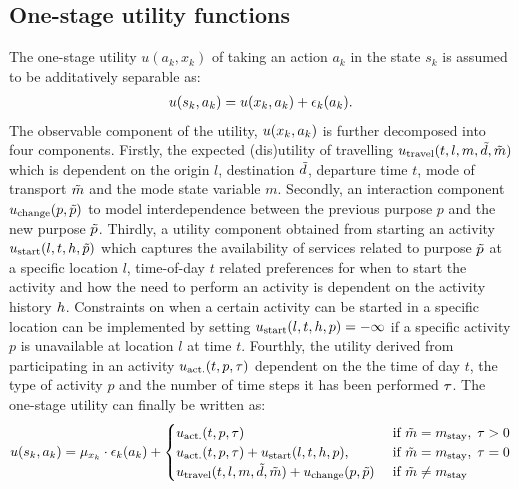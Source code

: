 \subsection{One-stage utility functions}
The one-stage utility $u(a_k,x_k)$ of taking an action $a_k$ in the state $s_k$ is assumed to be additatively separable as:
\begin{equation}
\begin{aligned}
	\avgu(s_k,a_k)& =\avgu(x_k,a_k) + \epsilon_k(a_k).\\
\end{aligned}
\end{equation}
The observable component of the utility, $u(x_k,a_k)$ is further decomposed into four components.
Firstly, the expected (dis)utility of travelling $u_\text{travel}(t,l,m,\tilde{d},\tilde{m})$ which is dependent on the origin $l$, destination $\tilde{d}$, departure time $t$, mode of transport $\tilde{m}$ and the mode state variable $m$. Secondly, an interaction component $u_\text{change}(p,\tilde{p})$ to model interdependence between the previous purpose $p$ and the new purpose $\tilde{p}$.
Thirdly, a utility component obtained from starting an activity $u_\text{start}(l,t,h, \tilde{p})$ which captures the availability of services related to purpose $\tilde{p}$ at a specific location $l$, time-of-day $t$ related preferences for when to start the activity and how the need to perform an activity is dependent on the activity history $h$. Constraints on when a certain activity can be started in a specific location can be implemented by setting $u_\text{start}(l,t,h, p)=-\infty$ if a specific activity $p$ is unavailable at location $l$ at time $t$.  Fourthly, the utility derived from participating in an activity $u_\text{act.}(t,p,\tau)$ dependent on the the time of day $t$, the type of activity $p$ and the number of time steps it has been performed $\tau$. The one-stage utility can finally be written as:
\begin{equation} \label{eq:mdponestage}
	\avgu(s_k,a_k) = \mu_{x_k}\cdot\epsilon_k(a_k) + \begin{cases}
	\uact(t,p,\atime) & \cif \act{m} = m_\text{stay}, \; \atime > 0 \\
	\uact(t,p,\atime) + \ustart(l,t,\amem, p), & \cif \act{m} = m_\text{stay},\; \atime = 0 \\
	\utravel(t,l,m,\act{d},\act{m})+\uchange(p,\act{p}) &\cif \act{m} \neq m_\text{stay} 
	\end{cases}
\end{equation}




